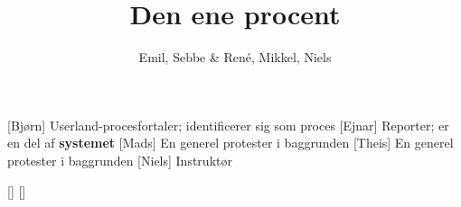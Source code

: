 \documentclass[a4paper,11pt]{article}
\title{Den ene procent}
\author{Emil, Sebbe \& René, Mikkel, Niels}
\begin{document}
\maketitle

\begin{roles}
[Bjørn] Userland-procesfortaler; identificerer sig som proces
[Ejnar] Reporter; er en del af \textbf{systemet}
[Mads] En generel protester i baggrunden
[Theis] En generel protester i baggrunden
[Niels] Instruktør
\end{roles}

\begin{props}
  []
  []
\end{props}
\end{document}
